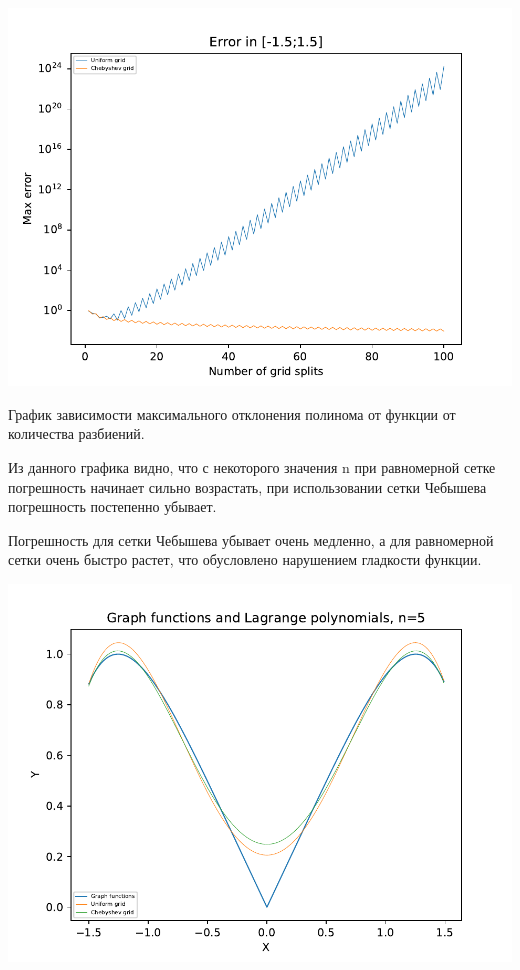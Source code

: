 \subsection{\begin{math}[-1.5;1.5]
     \end{math}}

\includegraphics[scale=0.75]{1.pdf}

График зависимости максимального отклонения полинома от функции от количества разбиений. 

Из данного графика видно, что с некоторого значения n при равномерной сетке погрешность начинает сильно возрастать, при использовании сетки Чебышева погрешность постепенно убывает. 

Погрешность для сетки Чебышева убывает очень медленно, а для равномерной сетки очень быстро растет, что обусловлено нарушением гладкости функции. 

\includegraphics[scale=0.75]{2.pdf}

